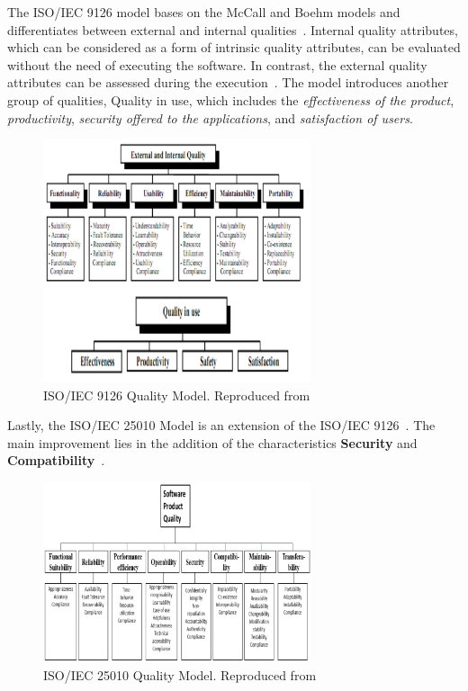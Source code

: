 The ISO/IEC 9126 model bases on the McCall and Boehm models and
differentiates between external and internal qualities~\cite{dap_model}. Internal quality
attributes, which can be considered as a form of intrinsic quality attributes,
can be evaluated without the
need of executing the software. In contrast, the external quality
attributes can be assessed during the execution~\cite{dap_model}. The model introduces
another group of qualities, Quality in use, which includes the
\textit{effectiveness of the product}, \textit{productivity}, \textit{security offered to the
applications}, and \textit{satisfaction of users}.

\begin{figure}[h!]
\centering
\includegraphics[width=0.7\textwidth]{images/iso-9126.jpg}
\caption{ISO/IEC 9126 Quality Model. Reproduced from~\cite{quality_models}}
\end{figure}

Lastly, the ISO/IEC 25010 Model is an extension of the ISO/IEC 9126~\cite{iso_25010_pdf}. The main improvement lies in the addition of the
characteristics \textbf{Security} and \textbf{Compatibility}~\cite{sqm_comparison}.

\begin{figure}[h!]
\centering
\includegraphics[width=0.7\textwidth]{images/iso-25010.jpg}
\caption{ISO/IEC 25010 Quality Model. Reproduced from~\cite{quality_models}}
\end{figure}

